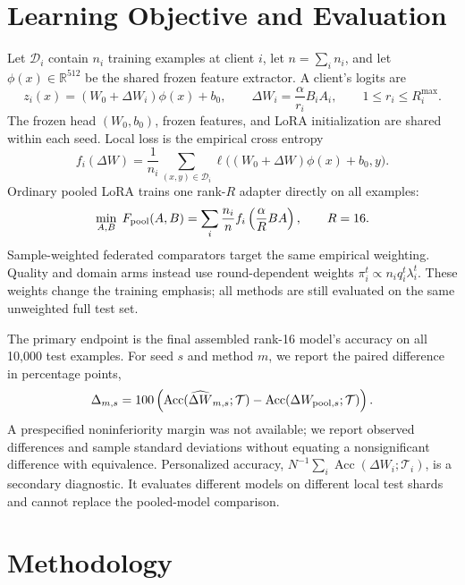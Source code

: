 \documentclass[11pt]{article}
\newcommand{\R}{\mathbb{R}}
\newcommand{\dW}{\Delta W}
\newcommand{\Acc}{\operatorname{Acc}}
\begin{document}
\section{Learning Objective and Evaluation}
Let $\mathcal D_i$ contain $n_i$ training examples at client $i$, let $n=\sum_i n_i$, and let $\phi(x)\in\R^{512}$ be the shared frozen feature extractor. A client's logits are
\begin{equation}
 z_i(x)=(W_0+\dW_i)\phi(x)+b_0,
 \qquad \dW_i=\frac{\alpha}{r_i}B_iA_i,
 \qquad 1\le r_i\le R_i^{\max}.
\end{equation}
The frozen head $(W_0,b_0)$, frozen features, and LoRA initialization are shared within each seed. Local loss is the empirical cross entropy
\begin{equation}
 f_i(\dW)=\frac1{n_i}\sum_{(x,y)\in\mathcal D_i}
 \ell\big((W_0+\dW)\phi(x)+b_0,y\big).
\end{equation}
Ordinary pooled LoRA trains one rank-$R$ adapter directly on all examples:
\begin{equation}
 \min_{A,B}\;F_{\rm pool}(A,B)=\sum_i\frac{n_i}{n}
 f_i\left(\frac{\alpha}{R}BA\right),\qquad R=16.
 \label{eq:pooled-objective}
\end{equation}
Sample-weighted federated comparators target the same empirical weighting. Quality and domain arms instead use round-dependent weights $\pi_i^t\propto n_iq_i^t\lambda_i^t$. These weights change the training emphasis; all methods are still evaluated on the same unweighted full test set.

The primary endpoint is the final assembled rank-16 model's accuracy on all 10,000 test examples. For seed $s$ and method $m$, we report the paired difference in percentage points,
\begin{equation}
 \Delta_{m,s}=100\left(\Acc(\widehat{\dW}_{m,s};\mathcal T)
 -\Acc(\dW_{{\rm pool},s};\mathcal T)\right).
 \label{eq:primary-endpoint}
\end{equation}
A prespecified noninferiority margin was not available; we report observed differences and sample standard deviations without equating a nonsignificant difference with equivalence. Personalized accuracy, $N^{-1}\sum_i\Acc(\dW_i;\mathcal T_i)$, is a secondary diagnostic. It evaluates different models on different local test shards and cannot replace the pooled-model comparison.

\section{Methodology}
\end{document}
